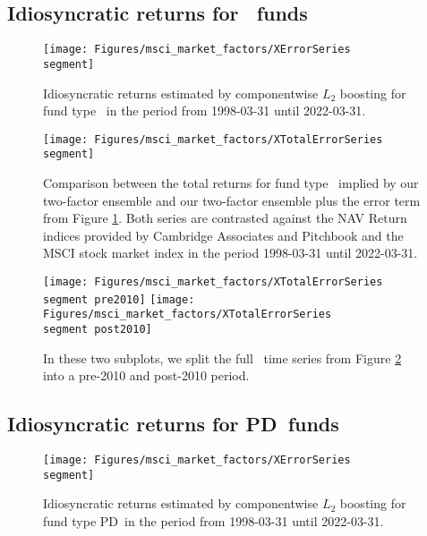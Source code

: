 \subsection{Idiosyncratic returns for \segment \ funds}
\label{sec:errors_\segment}

\begin{figure}[H]
	\centering
	\texttt{[image: Figures/msci\_market\_factors/XErrorSeries\\segment]}
	\caption{Idiosyncratic returns estimated by componentwise $L_2$ boosting for fund type \segment \ in the period from 1998-03-31 until 2022-03-31.}
	\label{fig:clb_idio_\segment}
\end{figure}

\begin{figure}[H]
	\centering
	\texttt{[image: Figures/msci\_market\_factors/XTotalErrorSeries\\segment]}
	\caption{
		Comparison between the total returns for fund type \segment \ implied by our two-factor ensemble and our two-factor ensemble plus the error term from Figure \ref{fig:clb_idio_\segment}.
		Both series are contrasted against the NAV Return indices provided by Cambridge Associates and Pitchbook and the MSCI stock market index in the period 1998-03-31 until 2022-03-31.
	}
	\label{fig:clb_total_\segment}
\end{figure}

\begin{figure}[H]
	\centering
	\texttt{[image: Figures/msci\_market\_factors/XTotalErrorSeries\\segment pre2010]}
	\texttt{[image: Figures/msci\_market\_factors/XTotalErrorSeries\\segment post2010]}
	\caption{
		In these two subplots, we split the full \segment \ time series from Figure \ref{fig:clb_total_\segment} into a pre-2010 and post-2010 period.
	}
	\label{fig:clb_pre_post_2010_\segment}
\end{figure}


\renewcommand{\segment}{PD}

\subsection{Idiosyncratic returns for \segment \ funds}
\label{sec:errors_pd}

\begin{figure}[H]
	\centering
	\texttt{[image: Figures/msci\_market\_factors/XErrorSeries\\segment]}
	\caption{Idiosyncratic returns estimated by componentwise $L_2$ boosting for fund type \segment \ in the period from 1998-03-31 until 2022-03-31.}
	\label{fig:clb_idio_\segment}
\end{figure}

